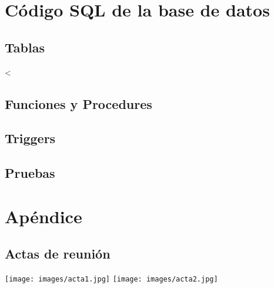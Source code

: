 \section{Código SQL de la base de datos}

\subsection{Tablas}
<

\subsection{Funciones y Procedures}


\subsection{Triggers}



\subsection{Pruebas}


\section{Apéndice}
\subsection{Actas de reunión}
\texttt{[image: images/acta1.jpg]} \newpage
\texttt{[image: images/acta2.jpg]}
